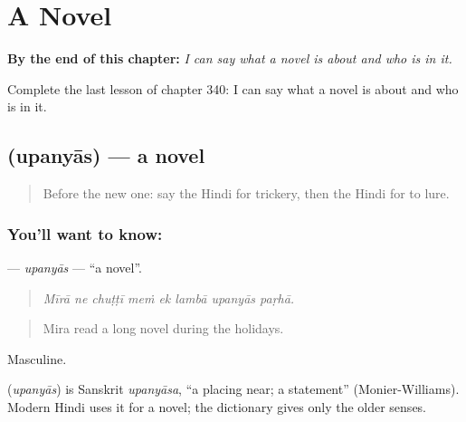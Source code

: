 
\chapter{A Novel}
\label{ch:hi-a-novel}

\begin{chapteropening}
\textbf{By the end of this chapter:} \emph{I can say what a novel is about and who is in it.}

Complete the last lesson of chapter 340: I can say what a novel is about and who is in it.
\end{chapteropening}

\section[\texorpdfstring{\hi{उपन्यास} (upanyās)}{उपन्यास (upanyās)}]{ (upanyās) — a novel}

\label{lesson:HI-C340-upanyas}



\begin{quote}
Before the new one: say the Hindi for trickery, then the Hindi for to lure.
\end{quote}

\subsection*{You'll want to know: }
\textbf{} — \emph{upanyās} — \textquotedblleft{}a novel\textquotedblright{}.

\begin{quote}
       
\end{quote}

\begin{quote}
\emph{Mīrā ne chuṭṭī meṁ ek lambā upanyās paṛhā.}
\end{quote}

\begin{quote}
Mira read a long novel during the holidays.
\end{quote}

Masculine.

\begin{cousinweb}
\textbf{} (\emph{upanyās}) is Sanskrit \emph{upanyāsa}, \textquotedblleft{}a placing near; a statement\textquotedblright{} (Monier-Williams). Modern Hindi uses it for a novel; the dictionary gives only the older senses.
\end{cousinweb}

